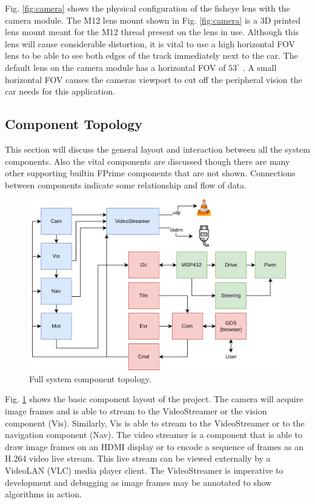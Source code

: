 \documentclass{article}
\begin{document}
Fig. \ref{fig:camera} shows the physical configuration of the fisheye lens
with the camera module. The M12 lens mount shown in Fig. \ref{fig:camera} is a 3D printed lens mount meant for the M12 thread present on the lens in use. Although this lens will cause considerable distortion, it is vital to use a high horizontal FOV lens to be able to see both edges of the track immediately next to the car. The default lens on the camera module has a horizontal FOV of $53^{\circ}$ \cite{b6}. A small horizontal FOV causes the cameras viewport to cut off the peripheral vision the car needs for this application.

\subsection{Component Topology}

This section will discuss the general layout and interaction between all the system components. Also the vital components are discussed though there are many other supporting builtin FPrime components that are not shown. Connections between components indicate some relationship and flow of data.

\begin{figure}[htb]
	\centering
	\centerline{\includegraphics[width=1.0\linewidth]{block}}
	\caption{Full system component topology.}
	\label{fig:block}
\end{figure}

Fig. \ref{fig:block} shows the basic component layout of the project. The camera will acquire image frames and is able to stream to the VideoStreamer or the vision component (Vis). Similarly, Vis is able to stream to the VideoStreamer or to the navigation component (Nav). The video streamer is a component that is able to draw image frames on an HDMI display or to encode a sequence of frames as an H.264 video live stream. This live stream can be viewed externally by a VideoLAN (VLC) media player client. The VideoStreamer is imperative to development and debugging as image frames may be annotated to show algorithms in action.
\end{document}
